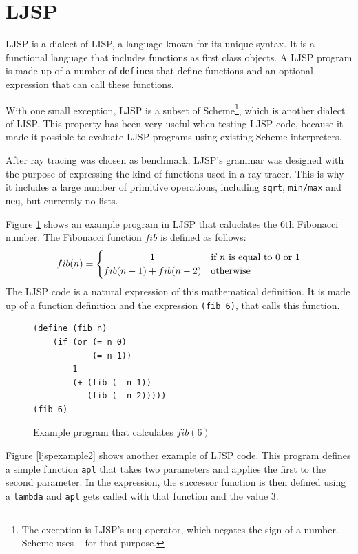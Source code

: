 \documentclass[11pt]{report}
\begin{document}
\section{LJSP}

LJSP is a dialect of LISP, a language known for its unique syntax. It is a functional language that includes functions as first class objects. A LJSP program is made up of a number of \texttt{define}s that define functions and an optional expression that can call these functions.

With one small exception, LJSP is a subset of Scheme\footnote{The exception is LJSP's \texttt{neg} operator, which negates the sign of a number. Scheme uses \texttt{-} for that purpose.}, which is another dialect of LISP. This property has been very useful when testing LJSP code, because it made it possible to evaluate LJSP programs using existing Scheme interpreters.

After ray tracing was chosen as benchmark, LJSP's grammar was designed with the purpose of expressing the kind of functions used in a ray tracer. This is why it includes a large number of primitive operations, including \texttt{sqrt}, \texttt{min/max} and \texttt{neg}, but currently no lists.

Figure \ref{ljspexample} shows an example program in LJSP that caluclates the 6th Fibonacci number. The Fibonacci function $fib$ is defined as follows:
\[
 fib(n) =
  \begin{cases} 
      \hfill 1                   \hfill & \text{if $n$ is equal to $0$ or $1$} \\
      \hfill fib(n-1) + fib(n-2) \hfill & \text{otherwise} \\
  \end{cases}
\]
The LJSP code is a natural expression of this mathematical definition. It is made up of a function definition and the expression \texttt{(fib 6)}, that calls this function.
\begin{figure}[ht]
\begin{lstlisting}
(define (fib n) 
    (if (or (= n 0) 
            (= n 1)) 
        1 
        (+ (fib (- n 1)) 
           (fib (- n 2)))))
(fib 6)
\end{lstlisting}
\caption{Example program that calculates $fib(6)$}
\label{ljspexample}
\end{figure}

Figure \ref{ljspexample2} shows another example of LJSP code. This program defines a simple function \texttt{apl} that takes two parameters and applies the first to the second parameter. In the expression, the successor function is then defined using a \texttt{lambda} and \texttt{apl} gets called with that function and the value $3$.
\end{document}
